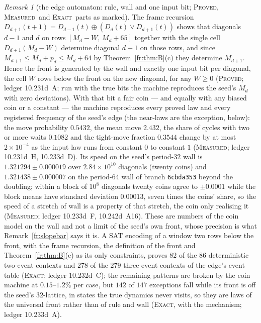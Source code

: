 \documentclass[11pt]{article}
\theoremstyle{definition}
\theoremstyle{remark}
\newtheorem{remark}[theorem]{Remark}
\newcommand{\PROVED}{\textsc{Proved}}
\newcommand{\EXACT}{\textsc{Exact}}
\newcommand{\MEASURED}{\textsc{Measured}}
\begin{document}
\begin{remark}[the edge automaton: rule, wall and one input bit; \PROVED, \MEASURED\ and \EXACT\ parts as marked]\label{fr:edgeautomaton}
The frame recursion $D_{d+1}(t+1)=D_{d-1}(t)\oplus(D_d(t)\vee D_{d+1}(t))$ shows that diagonals $d-1$ and $d$ on rows $[M_d-W,\,M_d+65]$ together with the single cell $D_{d+1}(M_d-W)$ determine diagonal $d+1$ on those rows, and since $M_{d+1}\le M_d+p_d\le M_d+64$ by Theorem~\ref{fr:thm:B}(c) they determine $M_{d+1}$. Hence the front is generated by the wall and exactly one input bit per diagonal, the cell $W$ rows below the front on the new diagonal, for any $W\ge0$ (\PROVED; ledger 10.231d~A; run with the true bits the machine reproduces the seed's $M_d$ with zero deviations). With that bit a fair coin --- and equally with any biased coin or a constant --- the machine reproduces every proved law and every registered frequency of the seed's edge (the near-laws are the exception, below): the move probability $0.5432$, the mean move $2.432$, the share of cycles with two or more waits $0.1082$ and the tight-move fraction $0.3544$ change by at most $2\times10^{-4}$ as the input law runs from constant $0$ to constant $1$ (\MEASURED; ledger 10.231d~H, 10.233d~D). Its speed on the seed's period-$32$ wall is $1.321294\pm0.000019$ over $2.84\times10^{10}$ diagonals (twenty coins) and $1.321438\pm0.000007$ on the period-$64$ wall of branch \texttt{6cbda353} beyond the doubling; within a block of $10^{8}$ diagonals twenty coins agree to $\pm0.0001$ while the block means have standard deviation $0.00013$, seven times the coins' share, so the speed of a stretch of wall is a property of that stretch, the coin only realising it (\MEASURED; ledger 10.233d~F, 10.242d~A16). These are numbers of the coin model on the wall and not a limit of the seed's own front, whose precision is what Remark~\ref{fr:slopebar} says it is. A SAT encoding of a window two rows below the front, with the frame recursion, the definition of the front and Theorem~\ref{fr:thm:B}(c) as its only constraints, proves $82$ of the $86$ deterministic two-event contexts and $278$ of the $279$ three-event contexts of the edge's event table (\EXACT; ledger 10.232d~C); the remaining patterns are broken by the coin machine at $0.15$--$1.2\%$ per case, but $142$ of $147$ exceptions fall while its front is off the seed's $32$-lattice, in states the true dynamics never visits, so they are laws of the universal front rather than of rule and wall (\EXACT, with the mechanism; ledger 10.233d~A).
\end{remark}
\end{document}
